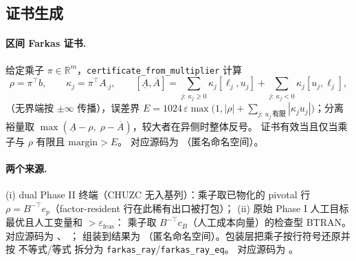\subsection{证书生成}
\label{subsec:engine-lp-cert}

\paragraph{区间 Farkas 证书.}
给定乘子 $\pi \in \mathbb{R}^m$，\texttt{certificate\_from\_multiplier} 计算
\begin{equation}
  \rho = \pi^{\top} b,\qquad
  \kappa_j = \pi^{\top} A_{\cdot j},\qquad
  [\underline{A}, \overline{A}] =
  \sum_{j:\,\kappa_j \ge 0} \kappa_j [\ell_j, u_j] +
  \sum_{j:\,\kappa_j < 0} \kappa_j [u_j, \ell_j],
  \label{eq:lpkernel:farkas-interval}
\end{equation}
（无界端按 $\pm\infty$ 传播），误差界
$E = 1024\,\varepsilon \max\bigl(1, |\rho| + \sum_{j:\,u_j\,\text{有限}}
|\kappa_j u_j|\bigr)$；分离裕量取
$\max(\underline{A} - \rho,\; \rho - \overline{A})$，较大者在异侧时整体反号。
证书有效当且仅当乘子与 $\rho$ 有限且 $\mathrm{margin} > E$。
对应源码为 
（匿名命名空间）。

\paragraph{两个来源.}
(i) dual Phase II 终端（CHUZC 无入基列）：乘子取已物化的 pivotal 行
$\rho = B^{-\top} e_p$（factor-resident 行在此稀有出口被打包）；
(ii) 原始 Phase I 人工目标最优且人工变量和 $> \varepsilon_{\text{feas}}$：
乘子取 $B^{-\top} c_B$（人工成本向量）的检查型 BTRAN。
对应源码为 、
；
组装到结果为 
（匿名命名空间）。包装层把乘子按行符号还原并按 不等式/等式 拆分为
\texttt{farkas\_ray}/\texttt{farkas\_ray\_eq}。
对应源码为 。

